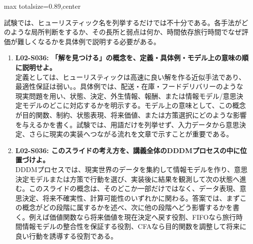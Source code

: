 \begin{minipage}[t]{0.58\textwidth}
\begin{adjustbox}{max totalsize={\textwidth}{0.89\textheight},center}
\begin{minipage}{\textwidth}
試験では、ヒューリスティック名を列挙するだけでは不十分である。各手法がどのような局所判断をするか、その長所と弱点は何か、時間依存旅行時間でなぜ評価が難しくなるかを具体例で説明する必要がある。\par{}\begin{enumerate}\item \textbf{L02-S036: 「解を見つける」の概念を、定義・具体例・モデル上の意味の順に説明せよ。}\\定義としては、ヒューリスティックは高速に良い解を作る近似手法であり、最適性保証は弱い。。具体例では、配送・在庫・フードデリバリーのような現実問題を用い、状態、決定、外生情報、報酬、または情報モデル/意思決定モデルのどこに対応するかを明示する。モデル上の意味として、この概念が目的関数、制約、状態表現、将来価値、または方策選択にどのような影響を与えるかを書く。試験では、用語だけを列挙せず、入力データから意思決定、さらに現実の実装へつながる流れを文章で示すことが重要である。\item \textbf{L02-S036: このスライドの考え方を、講義全体のDDDMプロセスの中に位置づけよ。}\\DDDMプロセスでは、現実世界のデータを集約して情報モデルを作り、意思決定モデルまたは方策で行動を選び、実装後に結果を観測して次の状態へ進む。このスライドの概念は、そのどこか一部だけではなく、データ表現、意思決定、将来不確実性、計算可能性のいずれかに関わる。答案では、まずこの概念がどの段階に属するかを述べ、次に他の段階へどう影響するかを書く。例えば価値関数なら将来価値を現在決定へ戻す役割、FIFOなら旅行時間情報モデルの整合性を保証する役割、CFAなら目的関数を調整して将来に良い行動を誘導する役割である。\end{enumerate}
\end{minipage}
\end{adjustbox}
\end{minipage}


